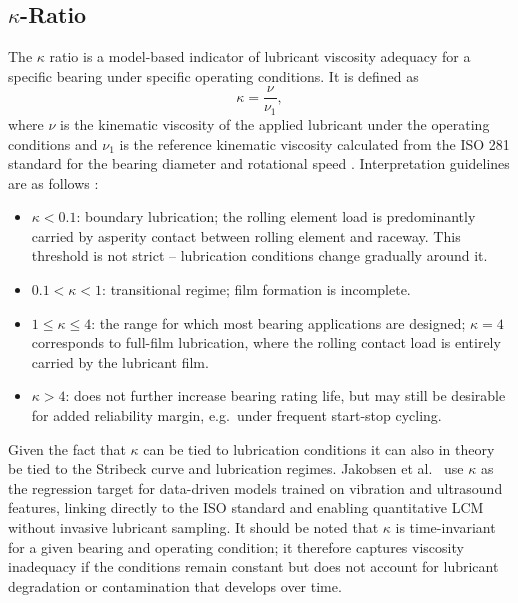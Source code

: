 \subsection{$\kappa$-Ratio}
\label{subsec:kappa}
The $\kappa$ ratio is a model-based indicator of lubricant viscosity adequacy for a specific bearing under specific operating conditions. It is defined as
\begin{equation}
\kappa = \frac{\nu}{\nu_{1}},
\end{equation}
where $\nu$ is the kinematic viscosity of the applied lubricant under the operating conditions and $\nu_{1}$ is the reference kinematic viscosity calculated from the ISO 281 standard for the bearing diameter and rotational speed \cite{jakobsen_detecting_2023}. Interpretation guidelines are as follows \cite{skf_lubrication_2026}:
\begin{itemize}
    \item $\kappa < 0.1$: boundary lubrication; the rolling element load is predominantly carried by asperity contact between rolling element and raceway. This threshold is not strict -- lubrication conditions change gradually around it.
    \item $0.1 < \kappa < 1$: transitional regime; film formation is incomplete.
    \item $1 \leq \kappa \leq 4$: the range for which most bearing applications are designed; $\kappa = 4$ corresponds to full-film lubrication, where the rolling contact load is entirely carried by the lubricant film.
    \item $\kappa > 4$: does not further increase bearing rating life, but may still be desirable for added reliability margin, e.g.\ under frequent start-stop cycling.
\end{itemize}
Given the fact that $\kappa$ can be tied to lubrication conditions it can also in theory be tied to the Stribeck curve and lubrication regimes. Jakobsen et al.\ \cite{jakobsen_detecting_2023,jakobsen_vibration_2021} use $\kappa$ as the regression target for data-driven models trained on vibration and ultrasound features, linking directly to the ISO standard and enabling quantitative LCM without invasive lubricant sampling. It should be noted that $\kappa$ is time-invariant for a given bearing and operating condition; it therefore captures viscosity inadequacy if the conditions remain constant but does not account for lubricant degradation or contamination that develops over time.
